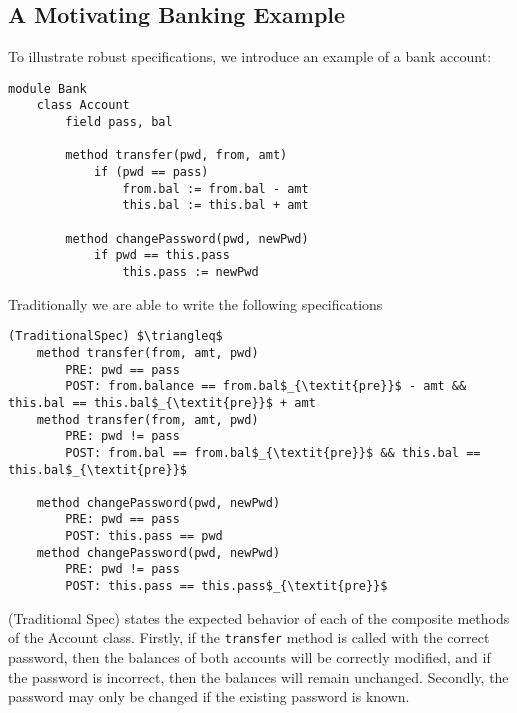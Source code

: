 \documentclass[acmsmall,review,anonymous]{acmart}\settopmatter{printfolios=true,printccs=false,printacmref=false}
\begin{document}
\subsection{A Motivating Banking Example}
To illustrate robust specifications, we introduce an example 
of a bank account:
\begin{lstlisting}[mathescape=true]
module Bank
	class Account
		field pass, bal
	
		method transfer(pwd, from, amt)
			if (pwd == pass)
				from.bal := from.bal - amt
				this.bal := this.bal + amt

		method changePassword(pwd, newPwd)
			if pwd == this.pass
				this.pass := newPwd
\end{lstlisting}
Traditionally we are able to write the following specifications
\begin{lstlisting}[mathescape=true]
(TraditionalSpec) $\triangleq$
	method transfer(from, amt, pwd)
		PRE: pwd == pass
		POST: from.balance == from.bal$_{\textit{pre}}$ - amt && this.bal == this.bal$_{\textit{pre}}$ + amt
	method transfer(from, amt, pwd)
		PRE: pwd != pass
		POST: from.bal == from.bal$_{\textit{pre}}$ && this.bal == this.bal$_{\textit{pre}}$

	method changePassword(pwd, newPwd)
		PRE: pwd == pass
		POST: this.pass == pwd
	method changePassword(pwd, newPwd)
		PRE: pwd != pass
		POST: this.pass == this.pass$_{\textit{pre}}$
\end{lstlisting}
(Traditional Spec) states the expected behavior of each of the composite methods of the 
Account class. Firstly, if the \texttt{transfer} method is called with the correct password,
then the balances of both accounts will be correctly modified, and if the password is incorrect, 
then the balances will remain unchanged. Secondly, the password may only be changed if the 
existing password is known. 
\end{document}

